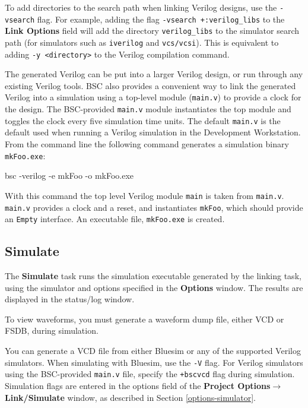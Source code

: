 \documentclass{article}
\newcommand{\te}[1]{\texttt{#1}}
\newenvironment{centerboxverbatim}
  {\center
   \boxedverbatim}
  {\endboxedverbatim
  {\endcenter }}
\begin{document}
To add  directories to the search path when linking Verilog designs,
use the \te{-vsearch}\index{-vsearch@\te{-vsearch} (compiler flag)} flag.
For example, adding the flag \te{-vsearch
+:verilog\_libs} to the {\bf Link Options} field will add the directory
\te{verilog\_libs} to the simulator search path (for simulators such
as \te{iverilog} and \te{vcs/vcsi}).  This is equivalent to adding \te{-y
<directory>} to the Verilog compilation command.

The generated Verilog can be put into a larger Verilog design, or run
through any existing Verilog tools.  BSC also provides a
convenient way to link the generated Verilog into a simulation using  a
top-level module (\te{main.v}) to provide a clock for the design.  The
BSC-provided \te{main.v} module instantiates the top module
and toggles the clock every five simulation time units.
The default \te{main.v} is the default  used when running a Verilog simulation in
the Development Workstation.
From the command line the following
command  generates a simulation binary \te{mkFoo.exe}:

\begin{centerboxverbatim}
bsc -verilog -e mkFoo -o mkFoo.exe
\end{centerboxverbatim}

With this command the top level Verilog module \te{main} is taken from
\te{main.v}.  \te{main.v} provides a clock and a reset, and
instantiates \te{mkFoo}, which should provide an \te{Empty}
interface.  An executable file, \te{mkFoo.exe} is created.


\subsection{Simulate}
\label{simulate}

The {\bf Simulate} task runs the simulation executable generated by the linking
task, using the simulator and options specified in the {\bf Options}
window.  The results are displayed in the status/log window.

To view waveforms, you must generate a waveform dump file, either VCD
 or FSDB, during simulation.


You can generate a VCD file from either Bluesim or any of the
 supported Verilog simulators.  When simulating with Bluesim, use
 the \te{-V} flag.   For Verilog simulators using
the BSC-provided \te{main.v} file, specify the \te{+bscvcd} flag during
simulation.   Simulation flags are entered in the options field of the
 {\bf Project Options$\rightarrow$Link/Simulate} window, as described
 in
Section \ref{options-simulator}.
\end{document}
